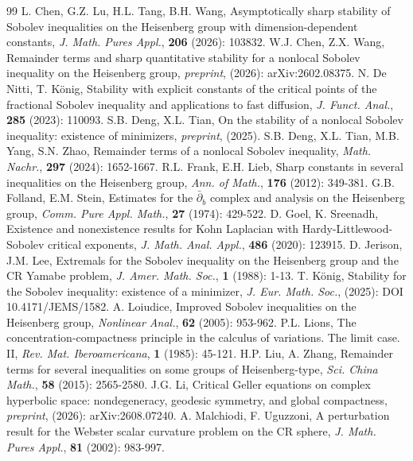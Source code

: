 \documentclass[10pt,a4paper]{amsart}
\begin{document}
\begin{thebibliography}{99}
 L. Chen, G.Z. Lu, H.L. Tang, B.H. Wang, Asymptotically sharp stability of Sobolev inequalities on the Heisenberg group with dimension-dependent constants, {\em J. Math. Pures Appl.}, {\bf 206} (2026): 103832.
 W.J. Chen, Z.X. Wang, Remainder terms and sharp quantitative stability for a nonlocal Sobolev inequality on the Heisenberg group, {\em preprint}, (2026): arXiv:2602.08375.
 N. De Nitti, T. K\"{o}nig, Stability with explicit constants of the critical points of the fractional Sobolev inequality and applications to fast diffusion, {\em J. Funct. Anal.}, {\bf 285} (2023): 110093.
 S.B. Deng, X.L. Tian, On the stability of a nonlocal Sobolev inequality: existence of minimizers, {\em preprint}, (2025).
 S.B. Deng, X.L. Tian, M.B. Yang, S.N. Zhao, Remainder terms of a nonlocal Sobolev inequality, {\em Math. Nachr.}, {\bf 297} (2024): 1652-1667.
 R.L. Frank, E.H. Lieb, Sharp constants in several inequalities on the Heisenberg group, {\em Ann. of Math.}, {\bf 176} (2012): 349-381.
 G.B. Folland, E.M. Stein, Estimates for the $\bar{\partial}_b$ complex and analysis on the Heisenberg group, {\em Comm. Pure Appl. Math.}, {\bf 27} (1974): 429-522.
 D. Goel, K. Sreenadh, Existence and nonexistence results for Kohn Laplacian with Hardy-Littlewood-Sobolev critical exponents, {\em J. Math. Anal. Appl.}, {\bf 486} (2020): 123915.
 D. Jerison, J.M. Lee, Extremals for the Sobolev inequality on the Heisenberg group and the CR Yamabe problem, {\em J. Amer. Math. Soc.}, {\bf 1} (1988): 1-13.
 T. K\"{o}nig, Stability for the Sobolev inequality: existence of a minimizer, {\em J. Eur. Math. Soc.}, (2025): DOI 10.4171/JEMS/1582.
 A. Loiudice, Improved Sobolev inequalities on the Heisenberg group, {\em Nonlinear Anal.}, {\bf 62} (2005): 953-962.
 P.L. Lions, The concentration-compactness principle in the calculus of variations. The limit case. II, {\em Rev. Mat. Iberoamericana}, {\bf 1} (1985): 45-121.
 H.P. Liu, A. Zhang, Remainder terms for several inequalities on some groups of Heisenberg-type, {\em Sci. China Math.}, {\bf 58} (2015): 2565-2580.
 J.G. Li, Critical Geller equations on complex hyperbolic space: nondegeneracy, geodesic symmetry, and global compactness, {\em preprint}, (2026): arXiv:2608.07240.
 A. Malchiodi, F. Uguzzoni, A perturbation result for the Webster scalar curvature problem on the CR sphere, {\em J. Math. Pures Appl.}, {\bf 81} (2002): 983-997.

\end{thebibliography}
\end{document}

